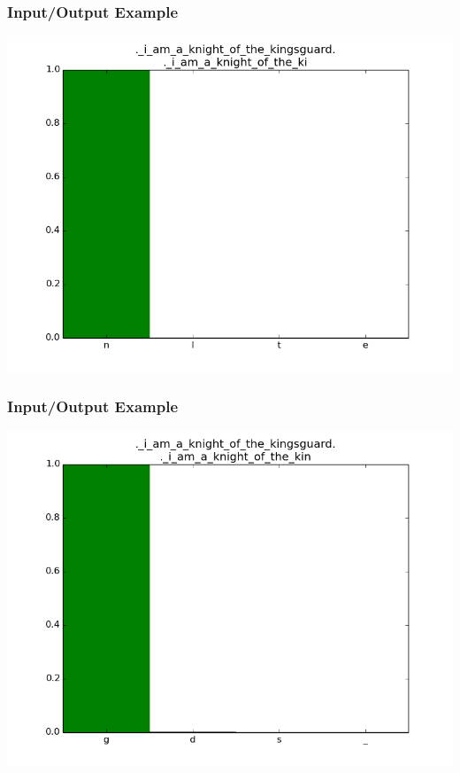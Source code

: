 \documentclass[12]{beamer}
\begin{document}
\begin{frame}
\frametitle{Input/Output Example}
\begin{center}
\includegraphics[scale=0.4]{../distplot/24.png}
\end{center}
\end{frame}

\begin{frame}
\frametitle{Input/Output Example}
\begin{center}
\includegraphics[scale=0.4]{../distplot/25.png}
\end{center}
\end{frame}
\end{document}

